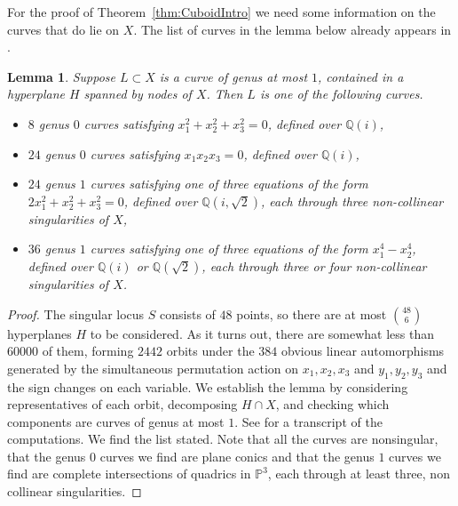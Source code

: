 \documentclass[12pt, reqno]{amsart}
\newtheorem{lemma}{Lemma}[section]
\theoremstyle{definition}
\newcommand{\PP}{{\mathbb P}}
\newcommand{\Q}{{\mathbb Q}}
\numberwithin{equation}{section}
\numberwithin{table}{section}
\begin{document}
For the proof of Theorem~\ref{thm:CuboidIntro} we need some information on the curves that do lie on $X$. The list of curves in the lemma below already appears in \cite{vanLuijk2000}.
\begin{lemma}\label{L:cuboid_hyperplanecurves}
Suppose $L\subset X$ is a curve of genus at most $1$, contained in a hyperplane $H$ spanned by nodes of $X$. Then $L$ is one of the following curves.
\begin{itemize}
	\item $8$ genus $0$ curves satisfying $x_1^2+x_2^2+x_3^2=0$, defined over $\Q(i)$,
	\item $24$ genus $0$ curves satisfying $x_1x_2x_3=0$, defined over $\Q(i)$,
	\item $24$ genus $1$ curves satisfying one of three equations of the form $2x_1^2+x_2^2+x_3^2=0$, defined over $\Q(i,\sqrt{2})$, each through three non-collinear singularities of $X$,
	\item $36$ genus $1$ curves satisfying one of three equations of the form $x_1^4-x_2^4$, defined over $\Q(i)$ or $\Q(\sqrt{2})$, each through three or four non-collinear singularities of $X$.
\end{itemize}
\end{lemma}
\begin{proof}
The singular locus $S$ consists of $48$ points, so there are at most $\binom{48}{6}$ hyperplanes $H$ to be considered. As it turns out, there are somewhat less than $60000$ of them, forming $2442$ orbits under the $384$ obvious linear automorphisms generated by the simultaneous permutation action on $x_1,x_2,x_3$ and $y_1,y_2,y_3$ and the sign changes on each variable. We establish the lemma by considering representatives of each orbit, decomposing $H\cap X$, and checking which components are curves of genus at most $1$. See \cite{electronic} for a transcript of the computations. We find the list stated. Note that all the curves are nonsingular, that the genus $0$ curves we find are plane conics and that the genus $1$ curves we find are complete intersections of quadrics in $\PP^3$, each through at least three, non collinear singularities.
\end{proof}
\end{document}
